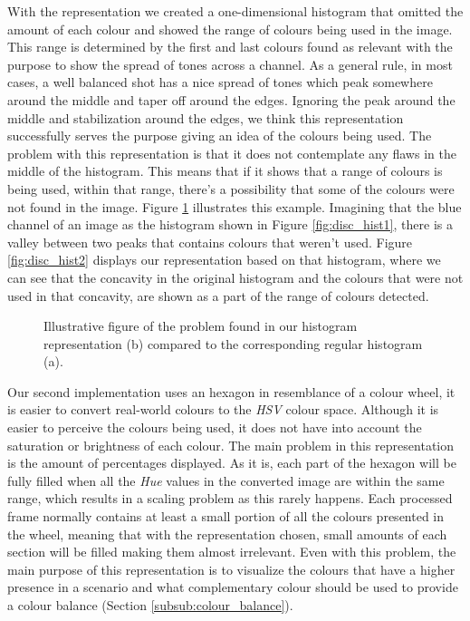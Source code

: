 With the representation we created a one-dimensional histogram that omitted the amount of each colour and showed the range of colours being used in the image. This range is determined by the first and last colours found as relevant with the purpose to show the spread of tones across a channel. As a general rule, in most cases, a well balanced shot has a nice spread of tones which peak somewhere around the middle and taper off around the edges. Ignoring the peak around the middle and stabilization around the edges, we think this representation successfully serves the purpose giving an idea of the colours being used. The problem with this representation is that it does not contemplate any flaws in the middle of the histogram. This means that if it shows that a range of colours is being used, within that range, there's a possibility that some of the colours were not found in the image. Figure \ref{fig:disc_hist} illustrates this example. Imagining that the blue channel of an image as the histogram shown in Figure \ref{fig:disc_hist1}, there is a valley between two peaks that contains colours that weren't used. Figure \ref{fig:disc_hist2} displays our representation based on that histogram, where we can see that the concavity in the original histogram and the colours that were not used in that concavity, are shown as a part of the range of colours detected.

\begin{figure}[htb]
	\centering
  	\caption{Illustrative figure of the problem found in our histogram representation (b) compared to the corresponding regular histogram (a).}
	\label{fig:disc_hist}
\end{figure}

Our second implementation uses an hexagon in resemblance of a colour wheel, it is easier to convert real-world colours to the \emph{HSV} colour space. Although it is easier to perceive the colours being used, it does not have into account the saturation or brightness of each colour. 
The main problem in this representation is the amount of percentages displayed. As it is, each part of the hexagon will be fully filled when all the \emph{Hue} values in the converted image are within the same range, which results in a scaling problem as this rarely happens. Each processed frame normally contains at least a small portion of all the colours presented in the wheel, meaning that with the representation chosen, small amounts of each section will be filled making them almost irrelevant. Even with this problem, the main purpose of this representation is to visualize the colours that have a higher presence in a scenario and what complementary colour should be used to provide a colour balance (Section \ref{subsub:colour_balance}).


